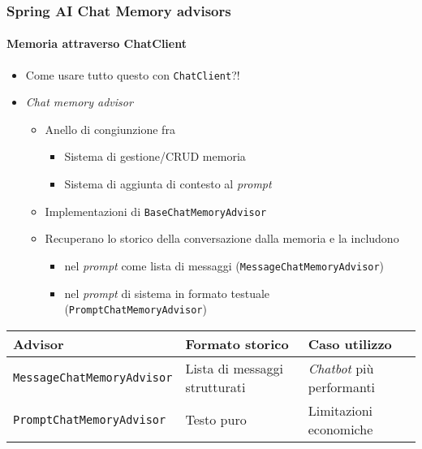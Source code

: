 \begin{frame}[t,fragile] \frametitle{Spring AI Chat Memory advisors}
    \framesubtitle{Memoria attraverso ChatClient}
    {\footnotesize
    \begin{itemize}[leftmargin=10pt,align=right]
        \item[\alert{\faArrowCircleRight}] Come usare tutto questo con \texttt{ChatClient}?! 
        \item[\alert{\faArrowCircleRight}] \alert{\textit{Chat memory advisor}}
        \begin{itemize}[leftmargin=10pt,align=right]
            \item[\alert{\faArrowCircleRight}] Anello di congiunzione fra
            \begin{itemize}[leftmargin=10pt,align=right]
                \item[\alert{\faArrowCircleRight}] Sistema di gestione/CRUD memoria
                \item[\alert{\faArrowCircleRight}] Sistema di aggiunta di contesto al \textit{prompt}
            \end{itemize}
            \item[\alert{\faArrowCircleRight}] Implementazioni di \alert{\texttt{BaseChatMemoryAdvisor}}
            \item[\alert{\faArrowCircleRight}] Recuperano lo storico della conversazione dalla memoria e la includono    
            \begin{itemize}[leftmargin=10pt,align=right]
                \item[\alert{\faArrowCircleRight}] nel \textit{prompt} come lista di messaggi (\alert{\texttt{MessageChatMemoryAdvisor}})
                \item[\alert{\faArrowCircleRight}] nel \textit{prompt} di sistema in formato testuale (\alert{\texttt{PromptChatMemoryAdvisor}})
            \end{itemize}
        \end{itemize}
    \end{itemize}
    {\footnotesize
	    \begin{table}
		    \setlength{\tabcolsep}{5pt}
		    \renewcommand{\arraystretch}{1.3}
		    \centering
		    \begin{tabular}{p{3.5cm}ll}
		        \toprule
		        \textbf{Advisor}                  & \textbf{Formato storico}      & \textbf{Caso utilizzo}           \\
		        \midrule
                \texttt{MessageChatMemoryAdvisor} & Lista di messaggi strutturati & \textit{Chatbot} più performanti \\
                \texttt{PromptChatMemoryAdvisor}  & Testo puro                    & Limitazioni economiche           \\
			    \bottomrule
			\end{tabular}
		\end{table}
	}
    }
\end{frame}
